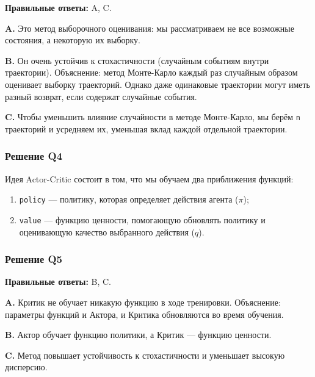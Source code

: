 \documentclass[11pt,a4paper]{article}
\begin{document}
\textbf{Правильные ответы:} A, C.

\textbf{A.} Это метод выборочного оценивания: мы рассматриваем не все возможные состояния, а некоторую их выборку.

\textbf{B.} Он очень устойчив к стохастичности (случайным событиям внутри траектории). Объяснение: метод Монте-Карло каждый раз случайным образом оценивает выборку траекторий. Однако даже одинаковые траектории могут иметь разный возврат, если содержат случайные события.

\textbf{C.} Чтобы уменьшить влияние случайности в методе Монте-Карло, мы берём \texttt{n} траекторий и усредняем их, уменьшая вклад каждой отдельной траектории.

\subsubsection{Решение Q4}\label{q4-solution}

Идея Actor-Critic состоит в том, что мы обучаем два приближения функций:

\begin{enumerate}
\def\labelenumi{\arabic{enumi}.}
\tightlist
\item
  \texttt{policy} --- политику, которая определяет действия агента (\(\pi\));
\item
  \texttt{value} --- функцию ценности, помогающую обновлять политику и оценивающую качество выбранного действия (\(q\)).
\end{enumerate}


\subsubsection{Решение Q5}\label{q5-solution}

\textbf{Правильные ответы:} B, C.

\textbf{A.} Критик не обучает никакую функцию в ходе тренировки. Объяснение: параметры функций и Актора, и Критика обновляются во время обучения.

\textbf{B.} Актор обучает функцию политики, а Критик --- функцию ценности.

\textbf{C.} Метод повышает устойчивость к стохастичности и уменьшает высокую дисперсию.
\end{document}
